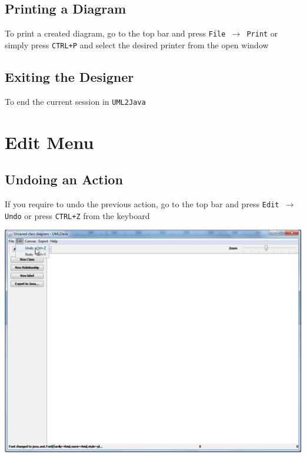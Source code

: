 \documentclass[a4paper]{article}
\begin{document}
\subsection{Printing a Diagram} 
To print a created diagram, go to the top bar and press \texttt{File $\rightarrow$ Print} or simply press \texttt{CTRL+P} and select the desired printer from the open window

\subsection{Exiting the Designer} 
To end the current session in \texttt{UML2Java}

\section{Edit Menu}
\subsection{Undoing an Action} 
If you require to undo the previous action, go to the top bar and press \texttt{Edit $\rightarrow$ Undo} or press \texttt{CTRL+Z} from the keyboard
\begin{center} \includegraphics[trim = 0pt 500pt 0pt 0pt, clip, scale=0.45]{./images/edit-undo.png} \end{center}
\end{document}
